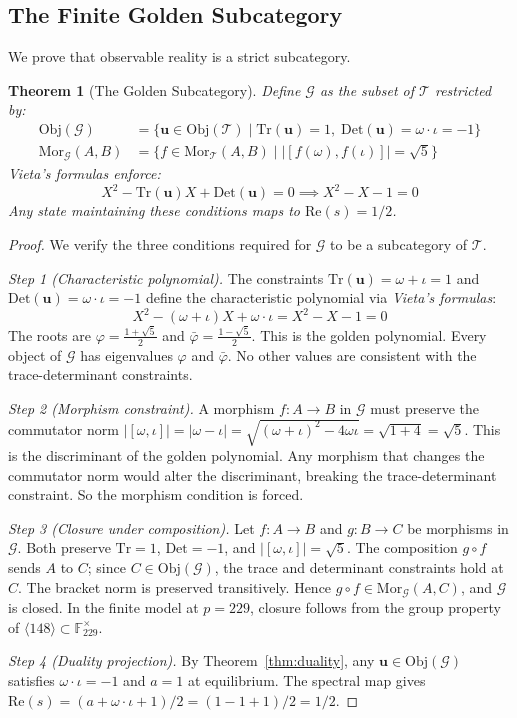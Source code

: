 \documentclass[12pt,oneside]{article}
\theoremstyle{principia}
\newtheorem{theorem}{Theorem}[section]
\theoremstyle{definition}
\theoremstyle{remark}
\providecommand{\FF}{\mathbb{F}}
\providecommand{\GG}{\mathcal{G}}
\providecommand{\TT}{\mathcal{T}}
\providecommand{\vp}{\varphi}
\providecommand{\vpbar}{\bar{\varphi}}
\begin{document}
\subsection{The Finite Golden Subcategory}

We prove that observable reality is a strict subcategory.

\begin{theorem}[The Golden Subcategory]\label{thm:golden-sub}
Define $\GG$ as the subset of $\TT$ restricted by:
\begin{align}
\mathrm{Obj}(\GG) &= \{ \mathbf{u} \in \mathrm{Obj}(\TT) \mid \mathrm{Tr}(\mathbf{u}) = 1,\; \mathrm{Det}(\mathbf{u}) = \omega \cdot \iota = -1 \} \\
\mathrm{Mor}_\GG(A,B) &= \{ f \in \mathrm{Mor}_\TT(A,B) \mid |[f(\omega), f(\iota)]| = \sqrt{5} \}
\end{align}
\emph{Vieta's formulas} enforce:
$$X^2 - \mathrm{Tr}(\mathbf{u})X + \mathrm{Det}(\mathbf{u}) = 0 \implies X^2 - X - 1 = 0$$
Any state maintaining these conditions maps to $\mathrm{Re}(s) = 1/2$.
\end{theorem}

\begin{proof}
We verify the three conditions required for $\GG$ to be a subcategory of $\TT$.

\emph{Step 1 (Characteristic polynomial).} The constraints $\mathrm{Tr}(\mathbf{u}) = \omega + \iota = 1$ and $\mathrm{Det}(\mathbf{u}) = \omega \cdot \iota = -1$ define the characteristic polynomial via \emph{Vieta's formulas}:
$$X^2 - (\omega + \iota)X + \omega \cdot \iota = X^2 - X - 1 = 0$$
The roots are $\vp = \frac{1 + \sqrt{5}}{2}$ and $\vpbar = \frac{1 - \sqrt{5}}{2}$. This is the golden polynomial. Every object of $\GG$ has eigenvalues $\vp$ and $\vpbar$. No other values are consistent with the trace-determinant constraints.

\emph{Step 2 (Morphism constraint).} A morphism $f : A \to B$ in $\GG$ must preserve the commutator norm $|[\omega, \iota]| = |\omega - \iota| = \sqrt{(\omega+\iota)^2 - 4\omega\iota} = \sqrt{1 + 4} = \sqrt{5}$. This is the discriminant of the golden polynomial. Any morphism that changes the commutator norm would alter the discriminant, breaking the trace-determinant constraint. So the morphism condition is forced.

\emph{Step 3 (Closure under composition).} Let $f : A \to B$ and $g : B \to C$ be morphisms in $\GG$. Both preserve $\mathrm{Tr} = 1$, $\mathrm{Det} = -1$, and $|[\omega, \iota]| = \sqrt{5}$. The composition $g \circ f$ sends $A$ to $C$; since $C \in \mathrm{Obj}(\GG)$, the trace and determinant constraints hold at $C$. The bracket norm is preserved transitively. Hence $g \circ f \in \mathrm{Mor}_\GG(A,C)$, and $\GG$ is closed. In the finite model at $p = 229$, closure follows from the group property of $\langle 148 \rangle \subset \FF_{229}^\times$.

\emph{Step 4 (Duality projection).} By Theorem~\ref{thm:duality}, any $\mathbf{u} \in \mathrm{Obj}(\GG)$ satisfies $\omega \cdot \iota = -1$ and $a = 1$ at equilibrium. The spectral map gives $\mathrm{Re}(s) = (a + \omega \cdot \iota + 1)/2 = (1 - 1 + 1)/2 = 1/2$. \qedhere
\end{proof}
\end{document}
